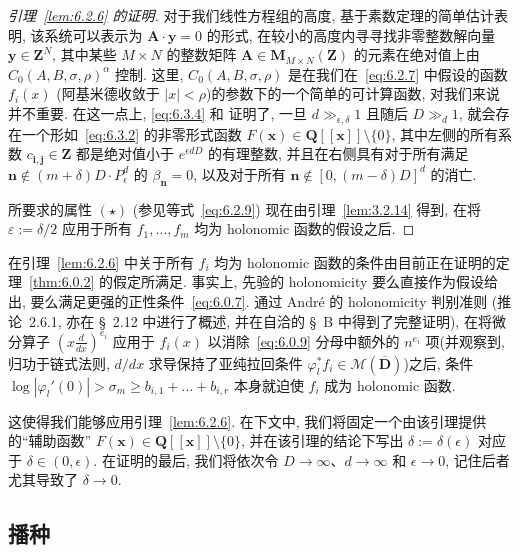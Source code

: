 \begin{proof}[引理~\ref{lem:6.2.6} 的证明]
对于我们线性方程组的高度, 基于素数定理的简单估计表明, 该系统可以表示为 $\mathbf{A} \cdot \mathbf{y} = 0$ 的形式, 在较小的高度内寻寻找非零整数解向量 $\mathbf{y} \in \mathbf{Z}^N$, 其中某些 $M \times N$ 的整数矩阵 $\mathbf{A} \in \mathbf{M}_{M \times N}(\mathbf{Z})$ 的元素在绝对值上由 $C_0(A, B, \sigma, \rho)^{\alpha}$ 控制.
这里, $C_0(A, B, \sigma, \rho)$ 是在我们在~\eqref{eq:6.2.7} 中假设的函数 $f_i(x)$ (阿基米德收敛于 $|x| < \rho$)的参数下的一个简单的可计算函数, 对我们来说并不重要.
在这一点上, \eqref{eq:6.3.4} 和 \cite[Lemma 2.9.1]{BG06} 证明了, 一旦 $d \gg_{\epsilon,\delta} 1$ 且随后 $D \gg_d 1$, 就会存在一个形如~\eqref{eq:6.3.2} 的非零形式函数 $F(\mathbf{x}) \in \mathbf{Q}[\![\mathbf{x}]\!] \setminus \{0\}$, 其中左侧的所有系数 $c_{\mathbf{i},\mathbf{j}} \in \mathbf{Z}$ 都是绝对值小于 $e^{\epsilon dD}$ 的有理整数, 并且在右侧具有对于所有满足 $\mathbf{n} \notin (m + \delta)D \cdot P_{\epsilon}^d$ 的 $\beta_{\mathbf{n}} = 0$, 以及对于所有 $\mathbf{n} \notin [0, (m - \delta)D]^d$ 的消亡.

所要求的属性 $(\star)$ (参见等式~\eqref{eq:6.2.9}) 现在由引理~\ref{lem:3.2.14} 得到, 在将 $\varepsilon := \delta/2$ 应用于所有 $f_1,\ldots,f_m$ 均为 holonomic 函数的假设之后.
\end{proof}

在引理~\ref{lem:6.2.6} 中关于所有 $f_i$ 均为 holonomic 函数的条件由目前正在证明的定理~\ref{thm:6.0.2} 的假定所满足.
事实上, 先验的 holonomicity 要么直接作为假设给出, 要么满足更强的正性条件~\eqref{eq:6.0.7}.
通过 Andr{\'e} 的 holonomicity 判别准则 (推论~2.6.1, 亦在 \S~2.12 中进行了概述, 并在自洽的 \S~B 中得到了完整证明), 在将微分算子 $\left(x\frac{d}{dx}\right)^{e_i}$ 应用于 $f_i(x)$ 以消除~\eqref{eq:6.0.9} 分母中额外的 $n^{e_i}$ 项(并观察到, 归功于链式法则, $d/dx$ 求导保持了亚纯拉回条件 $\varphi_l^* f_i \in \mathcal{M}(\overline{\mathbf{D}})$)之后, 条件 $\log |\varphi_l'(0)| > \sigma_m \ge b_{i,1} + \dots + b_{i,r}$ 本身就迫使 $f_i$ 成为 holonomic 函数.

这使得我们能够应用引理~\ref{lem:6.2.6}.
在下文中, 我们将固定一个由该引理提供的``辅助函数'' $F(\mathbf{x}) \in \mathbf{Q}[\![\mathbf{x}]\!] \setminus \{0\}$, 并在该引理的结论下写出 $\delta := \delta(\epsilon)$ 对应于 $\delta \in (0, \epsilon)$.
在证明的最后, 我们将依次令 $D \to \infty$、$d \to \infty$ 和 $\epsilon \to 0$, 记住后者尤其导致了 $\delta \to 0$.

\subsection{播种}\label{sec:6.4}

